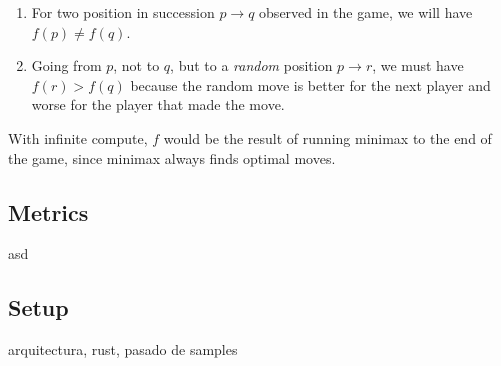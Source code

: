 \begin{enumerate}
\item For two position in succession $p \rightarrow q$  observed in the game, we will have $f(p) \neq f(q)$.
\item Going from $p$, not to $q$, but to a \textit{random} position $p \rightarrow r$, we must have $f(r) > f(q)$ because the random move is better for the next player and worse for the player that made the move.
\end{enumerate}

With infinite compute, $f$ would be the result of running minimax to the end of the game, since minimax always finds optimal moves.

\subsection{Metrics}

asd \cite{nnue:2018}

\subsection{Setup}

arquitectura, rust, pasado de samples
